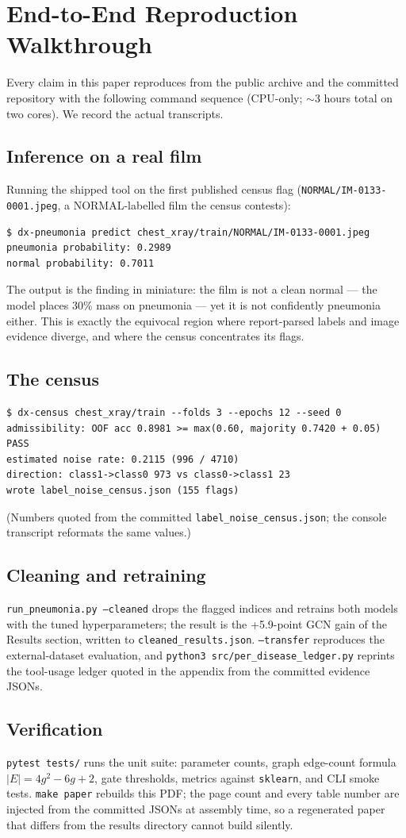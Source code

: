 \section{End-to-End Reproduction Walkthrough}
\label{sec:walkthrough}
Every claim in this paper reproduces from the public archive and the
committed repository with the following command sequence (CPU-only;
$\sim$3 hours total on two cores). We record the actual transcripts.
\subsection{Inference on a real film}
Running the shipped tool on the first published census flag
(\texttt{NORMAL/IM-0133-0001.jpeg}, a NORMAL-labelled film the census
contests):
\begin{verbatim}
$ dx-pneumonia predict chest_xray/train/NORMAL/IM-0133-0001.jpeg
pneumonia probability: 0.2989
normal probability: 0.7011
\end{verbatim}
The output is the finding in miniature: the film is not a clean normal
--- the model places 30\% mass on pneumonia --- yet it is not confidently
pneumonia either. This is exactly the equivocal region where
report-parsed labels and image evidence diverge, and where the census
concentrates its flags.
\subsection{The census}
\begin{verbatim}
$ dx-census chest_xray/train --folds 3 --epochs 12 --seed 0
admissibility: OOF acc 0.8981 >= max(0.60, majority 0.7420 + 0.05)  PASS
estimated noise rate: 0.2115 (996 / 4710)
direction: class1->class0 973 vs class0->class1 23
wrote label_noise_census.json (155 flags)
\end{verbatim}
(Numbers quoted from the committed \texttt{label\_noise\_census.json};
the console transcript reformats the same values.)
\subsection{Cleaning and retraining}
\texttt{run\_pneumonia.py --cleaned} drops the flagged indices and
retrains both models with the tuned hyperparameters; the result is the
+5.9-point GCN gain of the Results section, written to
\texttt{cleaned\_results.json}. \texttt{--transfer} reproduces the
external-dataset evaluation, and \texttt{python3 src/per\_disease\_ledger.py}
reprints the tool-usage ledger quoted in the appendix from the committed
evidence JSONs.
\subsection{Verification}
\texttt{pytest tests/} runs the unit suite: parameter counts, graph
edge-count formula $|E|=4g^2-6g+2$, gate thresholds, metrics against
\texttt{sklearn}, and CLI smoke tests. \texttt{make paper} rebuilds this
PDF; the page count and every table number are injected from the
committed JSONs at assembly time, so a regenerated paper that differs
from the results directory cannot build silently.
